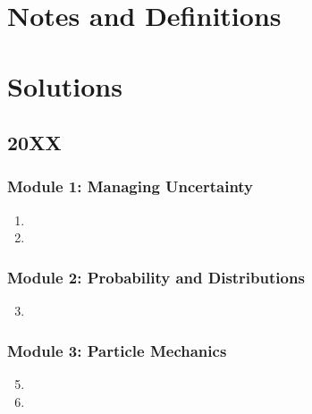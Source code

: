 \documentclass[fleqn,titlepage]{book}
\numberwithin{equation}{section}
\theoremstyle{plain}
\theoremstyle{definition}
\theoremstyle{remark}
\begin{document}
\part{Notes and Definitions}




\part{Solutions}


\chapter{20XX}
\section{Module 1: Managing Uncertainty}
\begin{enumerate}[label=\bfseries  \arabic*.]\setcounter{enumi}{0}
\item 
\item 
\end{enumerate}
\section{Module 2: Probability and Distributions}
\begin{enumerate}[label=\bfseries  \arabic*.]\setcounter{enumi}{2}
\item 
\end{enumerate}
\section{Module 3: Particle Mechanics}
\begin{enumerate}[label=\bfseries  \arabic*.]\setcounter{enumi}{4}
\item %
\item %
\end{enumerate}
\end{document}
